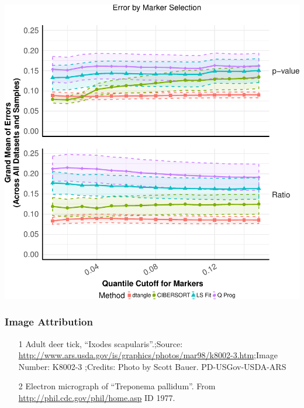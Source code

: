 \documentclass[usenames,dvipsnames,15pt]{beamer}
\newcommand{\backupend}{
   \setcounter{framenumber}{\value{finalframe}}
}
\begin{document}
\begin{frame}
  \includegraphics[scale=.45]{pictures/q_mean}
\end{frame}

\begin{frame}
  \frametitle{Image Attribution}
  \begin{enumerate}
  \item [1] Adult deer tick, ``Ixodes scapularis''.;Source: \url{http://www.ars.usda.gov/is/graphics/photos/mar98/k8002-3.htm};Image Number: K8002-3 ;Credits: Photo by Scott Bauer. PD-USGov-USDA-ARS
  \item [2] Electron micrograph of ``Treponema pallidum''. From \url{http://phil.cdc.gov/phil/home.asp} ID 1977. 
  \end{enumerate}
\end{frame}

\begin{frame}[allowframebreaks]

\end{frame}

\backupend
\end{document}

